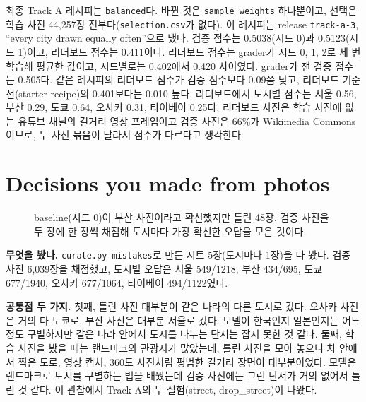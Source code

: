 \documentclass[11pt]{article}
\begin{document}
최종 Track A 레시피는 \texttt{balanced}다. 바뀐 것은 \texttt{sample\_weights}
하나뿐이고, 선택은 학습 사진 44,257장 전부다(\texttt{selection.csv}가 없다). 이
레시피는 release \texttt{track-a-3}, ``every city drawn equally often''으로 냈다.
검증 점수는 0.5038(시드 0)과 0.5123(시드 1)이고, 리더보드 점수는 0.411이다. 리더보드
점수는 grader가 시드 0, 1, 2로 세 번 학습해 평균한 값이고, 시드별로는 0.402에서
0.420 사이였다. grader가 잰 검증 점수는 0.505다. 같은 레시피의 리더보드 점수가 검증
점수보다 0.09쯤 낮고, 리더보드 기준선(starter recipe)의 0.401보다는 0.010 높다. 리더보드에서
도시별 점수는 서울 0.56, 부산 0.29, 도쿄 0.64, 오사카 0.31, 타이베이 0.25다.
리더보드 사진은 학습 사진에 없는 유튜브 채널의 길거리 영상 프레임이고 검증 사진은
66\%가 Wikimedia Commons이므로, 두 사진 묶음이 달라서 점수가 다르다고 생각한다.

\section*{Decisions you made from photos}

\begin{figure}[h]
\centering
{}
\caption{baseline(시드 0)이 부산 사진이라고 확신했지만 틀린 48장. 검증 사진을 두 장에
한 장씩 채점해 도시마다 가장 확신한 오답을 모은 것이다.}
\end{figure}

\textbf{무엇을 봤나.} \texttt{curate.py mistakes}로 만든 시트 5장(도시마다 1장)을 다
봤다. 검증 사진 6,039장을 채점했고, 도시별 오답은 서울 549/1218, 부산 434/695,
도쿄 677/1940, 오사카 677/1064, 타이베이 494/1122였다.

\textbf{공통점 두 가지.} 첫째, 틀린 사진 대부분이 같은 나라의 다른 도시로 갔다.
오사카 사진은 거의 다 도쿄로, 부산 사진은 대부분 서울로 갔다. 모델이 한국인지
일본인지는 어느 정도 구별하지만 같은 나라 안에서 도시를 나누는 단서는 잡지 못한 것
같다. 둘째, 학습 사진을 봤을 때는 랜드마크와 관광지가 많았는데, 틀린 사진을 모아
놓으니 차 안에서 찍은 도로, 영상 캡처, 360도 사진처럼 평범한 길거리 장면이
대부분이었다. 모델은 랜드마크로 도시를 구별하는 법을 배웠는데 검증 사진에는 그런
단서가 거의 없어서 틀린 것 같다. 이 관찰에서 Track A의 두 실험(street,
drop\_street)이 나왔다.
\end{document}

